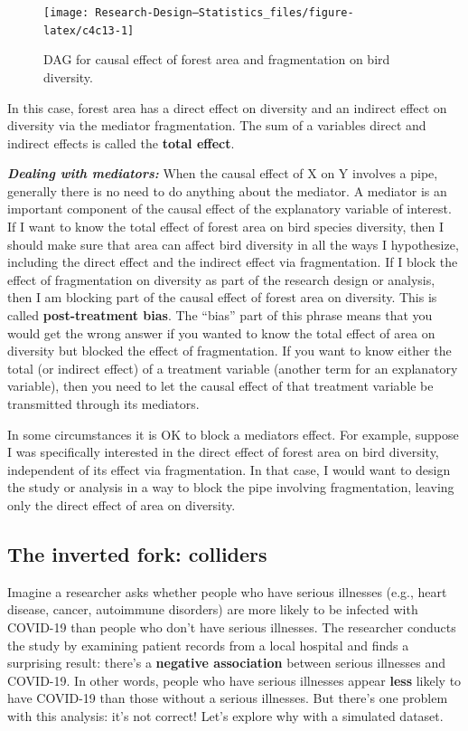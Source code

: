 \documentclass[
]{book}
\begin{document}
\begin{figure}

{\centering \texttt{[image: Research-Design---Statistics\_files/figure-latex/c4c13-1]} 

}

\caption{DAG for causal effect of forest area and fragmentation on bird diversity.}\label{fig:c4c13}
\end{figure}

In this case, forest area has a direct effect on diversity and an indirect effect on diversity via the mediator fragmentation. The sum of a variables direct and indirect effects is called the \textbf{total effect}.

\textbf{\emph{Dealing with mediators:}} When the causal effect of X on Y involves a pipe, generally there is no need to do anything about the mediator. A mediator is an important component of the causal effect of the explanatory variable of interest. If I want to know the total effect of forest area on bird species diversity, then I should make sure that area can affect bird diversity in all the ways I hypothesize, including the direct effect and the indirect effect via fragmentation. If I block the effect of fragmentation on diversity as part of the research design or analysis, then I am blocking part of the causal effect of forest area on diversity. This is called \textbf{post-treatment bias}. The ``bias'' part of this phrase means that you would get the wrong answer if you wanted to know the total effect of area on diversity but blocked the effect of fragmentation. If you want to know either the total (or indirect effect) of a treatment variable (another term for an explanatory variable), then you need to let the causal effect of that treatment variable be transmitted through its mediators.

In some circumstances it is OK to block a mediators effect. For example, suppose I was specifically interested in the direct effect of forest area on bird diversity, independent of its effect via fragmentation. In that case, I would want to design the study or analysis in a way to block the pipe involving fragmentation, leaving only the direct effect of area on diversity.

\subsection{The inverted fork: colliders}\label{the-inverted-fork-colliders}

Imagine a researcher asks whether people who have serious illnesses (e.g., heart disease, cancer, autoimmune disorders) are more likely to be infected with COVID-19 than people who don't have serious illnesses. The researcher conducts the study by examining patient records from a local hospital and finds a surprising result: there's a \textbf{negative association} between serious illnesses and COVID-19. In other words, people who have serious illnesses appear \textbf{less} likely to have COVID-19 than those without a serious illnesses. But there's one problem with this analysis: it's not correct! Let's explore why with a simulated dataset.
\end{document}
